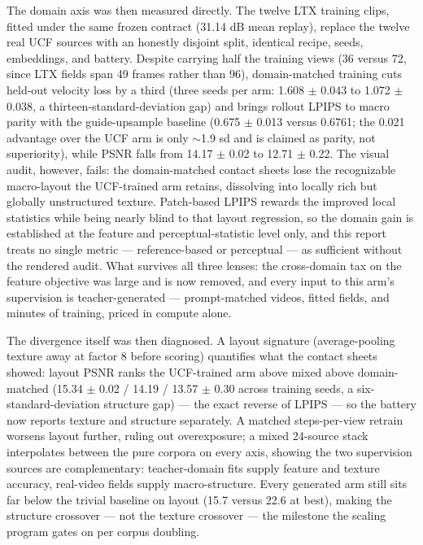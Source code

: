 \documentclass[10pt]{article}
\begin{document}
The domain axis was then measured directly. The twelve LTX training clips, fitted under the
same frozen contract (31.14 dB mean replay), replace the twelve real UCF sources with an
honestly disjoint split, identical recipe, seeds, embeddings, and battery. Despite carrying
half the training views (36 versus 72, since LTX fields span 49 frames rather than 96),
domain-matched training cuts held-out velocity loss by a third (three seeds per arm: 1.608
$\pm$ 0.043 to 1.072 $\pm$ 0.038, a thirteen-standard-deviation gap) and brings rollout LPIPS
to macro parity with the guide-upsample baseline (0.675 $\pm$ 0.013 versus 0.6761; the 0.021
advantage over the UCF arm is only $\sim$1.9 sd and is claimed as parity, not superiority),
while PSNR falls from 14.17 $\pm$ 0.02 to 12.71 $\pm$ 0.22. The visual audit, however, fails: the domain-matched contact
sheets lose the recognizable macro-layout the UCF-trained arm retains, dissolving into locally
rich but globally unstructured texture. Patch-based LPIPS rewards the improved local statistics
while being nearly blind to that layout regression, so the domain gain is established at the
feature and perceptual-statistic level only, and this report treats no single metric ---
reference-based or perceptual --- as sufficient without the rendered audit. What survives all
three lenses: the cross-domain tax on the feature objective was large and is now removed, and
every input to this arm's supervision is teacher-generated --- prompt-matched videos, fitted
fields, and minutes of training, priced in compute alone.

The divergence itself was then diagnosed. A layout signature (average-pooling texture away at
factor 8 before scoring) quantifies what the contact sheets showed: layout PSNR ranks the
UCF-trained arm above mixed above domain-matched (15.34 $\pm$ 0.02 / 14.19 / 13.57 $\pm$ 0.30
across training seeds, a six-standard-deviation structure gap) --- the exact reverse of LPIPS
--- so the battery now reports texture and structure separately. A matched
steps-per-view retrain worsens layout further, ruling out overexposure; a mixed 24-source stack
interpolates between the pure corpora on every axis, showing the two supervision sources are
complementary: teacher-domain fits supply feature and texture accuracy, real-video fields
supply macro-structure. Every generated arm still sits far below the trivial baseline on layout
(15.7 versus 22.6 at best), making the structure crossover --- not the texture crossover ---
the milestone the scaling program gates on per corpus doubling.
\end{document}
